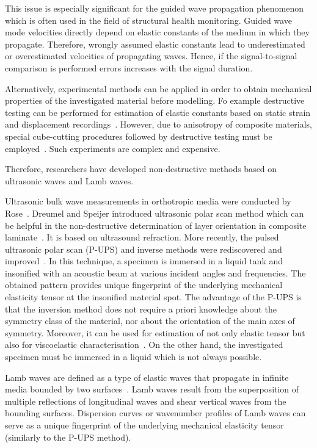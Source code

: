\documentclass[preprint,12pt]{elsarticle}
\begin{document}
This issue is especially significant for the guided wave propagation phenomenon which is often used in the field of structural health monitoring. 
Guided wave mode velocities directly depend on elastic constants of the medium in which they propagate.
Therefore, wrongly assumed elastic constants lead to underestimated or overestimated velocities of propagating waves. 
Hence, if the signal-to-signal comparison is performed errors increases with the signal duration.

Alternatively, experimental methods can be applied in order to obtain mechanical properties of the investigated material before modelling. 
Fo example destructive testing can be performed for estimation of elastic constants based on static strain and displacement recordings~\cite{Wang2000,Petersen2016}.
However, due to anisotropy of composite materials, special cube-cutting procedures followed by destructive testing must be employed~\cite{Rose1991}.
Such experiments are complex and expensive.

Therefore, researchers have developed non-destructive methods based on ultrasonic waves and Lamb waves.

Ultrasonic bulk wave measurements in orthotropic media were conducted by Rose~\cite{Rose1999}.
Dreumel and Speijer introduced ultrasonic polar scan method which can be helpful in the non-destructive determination of layer orientation in composite laminate~\cite{VanDreumel1982}. 
It is based on ultrasound refraction.
More recently, the pulsed ultrasonic polar scan (P-UPS) and inverse methods were rediscovered and improved~\cite{Kersemans2014,Martens2017}. 
In this technique, a specimen is immersed in a liquid tank and insonified with an acoustic beam at various incident angles and frequencies. The obtained pattern provides unique fingerprint of the underlying mechanical elasticity tensor at the insonified material spot.
The advantage of the P-UPS is that the inversion method does not require a priori knowledge about the symmetry class of the material, nor about the orientation of the main axes of symmetry.
Moreover, it can be used for estimation of not only elastic tensor but also for viscoelastic characterisation~\cite{Martens2019}.	
On the other hand, the investigated specimen must be immersed in a liquid which is not always possible.

Lamb waves are defined as a type of elastic waves that propagate in infinite media bounded by two surfaces~\cite{Rose1999}. 
Lamb waves result from the superposition of multiple reflections of longitudinal waves and shear vertical waves from the bounding surfaces.
Dispersion curves or wavenumber profiles of Lamb waves can serve as a unique fingerprint of the underlying mechanical elasticity tensor (similarly to the P-UPS method).
\end{document}
